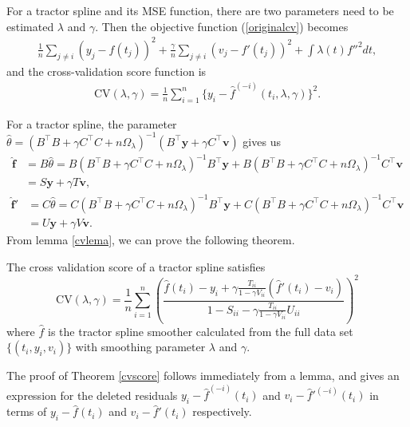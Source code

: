 For a tractor spline and its MSE function, there are two parameters need to be estimated $\lambda$ and $\gamma$. Then the objective function (\ref{originalcv}) becomes
\begin{align}
\frac{1}{n}\sum_{j \neq i}(y_j-f(t_j))^2+\frac{\gamma}{n}\sum_{j \neq i}(v_j-f'(t_j))^2+ \int \lambda(t)f''^2dt,
\end{align}
and the cross-validation score function is
\begin{align}
\mbox{CV}(\lambda,\gamma)=\frac{1}{n}\sum_{i=1}^{n}\{y_i-\hat{f}^{(-i)}(t_i,\lambda,\gamma)\}^2.
\end{align}

For a tractor spline, the parameter $\hat{\theta}=(B^\top B+\gamma C^\top C+n\Omega_\lambda)^{-1}(B^\top\mathbf{y}+\gamma C^\top\mathbf{v})$ gives us
\begin{equation}
\begin{split}
 \hat{\mathbf{f}}&=B\hat{\theta}=B(B^\top B+\gamma C^\top C+n\Omega_\lambda)^{-1}B^\top\mathbf{y}+B(B^\top B+\gamma C^\top C+n\Omega_\lambda)^{-1}C^\top\mathbf{v}\\&=S\mathbf{y}+\gamma T\mathbf{v},
 \end{split}
 \end{equation}
 \begin{equation}
 \begin{split}
\hat{\mathbf{f}}'&=C\hat{\theta}=C(B^\top B+\gamma C^\top C+n\Omega_\lambda)^{-1}B^\top\mathbf{y}+C(B^\top B+\gamma C^\top C+n\Omega_\lambda)^{-1}C^\top\mathbf{v}\\&=U\mathbf{y}+\gamma V\mathbf{v}.
 \end{split}
\end{equation}
From lemma \ref{cvlema}, we can prove the following theorem.
\begin{theorem}\label{cvscore}
The cross validation score of a tractor spline satisfies
\begin{equation}\label{tractorcv}
\mbox{CV}(\lambda,\gamma)=\frac{1}{n}\sum_{i=1}^{n} \left( \frac{\hat{f}(t_i)-y_i+\gamma \frac{T_{ii}}{1-\gamma V_{ii}}(\hat{f}'(t_i)-v_i)}{1-S_{ii}-\gamma\frac{T_{ii}}{1-\gamma V_{ii}}U_{ii}} \right)^2
\end{equation}
where $\hat{f}$ is the tractor spline smoother calculated from the full data set $\{(t_i,y_i,v_i)\}$ with smoothing parameter $\lambda$ and $\gamma$.
\end{theorem}

The proof of Theorem \ref{cvscore} follows immediately from a lemma, and gives an expression for the deleted residuals $y_i-\hat{f}^{(-i)}(t_i)$ and $v_i-\hat{f}'^{(-i)}(t_i)$ in terms of $y_i-\hat{f}(t_i)$ and $v_i-\hat{f}'(t_i)$ respectively. 

